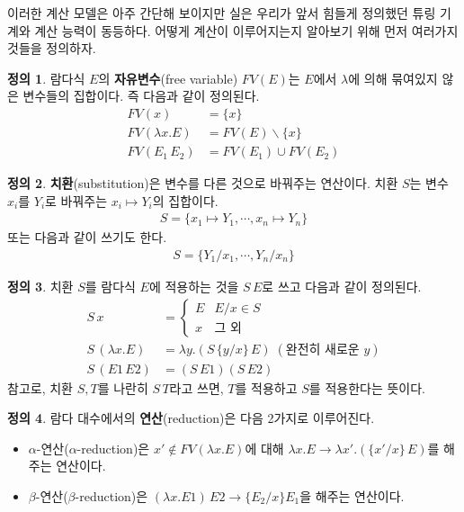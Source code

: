 \documentclass[b5paper]{book}
\theoremstyle{definition}
\newtheorem{defn}{정의}[chapter]
\begin{document}
이러한 계산 모델은 아주 간단해 보이지만 실은 우리가 앞서 힘들게 정의했던 튜링 기계와 계산 능력이
동등하다. 어떻게 계산이 이루어지는지 알아보기 위해 먼저 여러가지 것들을 정의하자.
\begin{defn}
    람다식 $E$의 \textbf{자유변수}(free variable) $FV(E)$는 $E$에서 $\lambda$에 의해 묶여있지 않은
    변수들의 집합이다. 즉 다음과 같이 정의된다.
    \begin{align*}
        FV(x) &= \{ x \} \\ 
        FV(\lambda x. E) &= FV(E) \backslash \{x\} \\ 
        FV(E_1 \, E_2) &= FV(E_1) \cup FV(E_2) 
    \end{align*}
\end{defn}
\begin{defn}
    \textbf{치환}(substitution)은 변수를 다른 것으로 바꿔주는 연산이다. 치환 $S$는 변수 $x_i$를
    $Y_i$로 바꿔주는 $x_i \mapsto Y_i$의 집합이다.
    \begin{align*}
        S = \{ x_1 \mapsto Y_1, \cdots, x_n \mapsto Y_n\}
    \end{align*}
    또는 다음과 같이 쓰기도 한다.
    \begin{align*}
        S = \{ Y_1 / x_1, \cdots, Y_n / x_n \}
    \end{align*}
\end{defn}
\begin{defn}
    치환 $S$를 람다식 $E$에 적용하는 것을 $S \, E$로 쓰고 다음과 같이 정의된다.
    \begin{align*}
        S \, x &= 
            \begin{cases}
                E & E/x \in S \\
                x & \text{그 외} 
            \end{cases}  \\ 
        S \, (\lambda x. E) &= 
        \lambda y. (S \, \{ y/x\} \, E) \; (\text{완전히 새로운 } y) \\ 
        S \, (E1 \, E2) &= (S \, E1) (S \, E2) 
    \end{align*} 
    참고로, 치환 $S, T$를 나란히 $S \, T$라고 쓰면, $T$를 적용하고 $S$를 적용한다는 뜻이다.
\end{defn}
\begin{defn}
    람다 대수에서의 \textbf{연산}(reduction)은 다음 2가지로 이루어진다.
    \begin{itemize}
        \item $\alpha$-연산($\alpha$-reduction)은 
        $x' \notin FV(\lambda x. E)$에 대해 
        $\lambda x. E \rightarrow \lambda x'. (\{x'/x\} \, E)$를 해주는 연산이다.
        \item $\beta$-연산($\beta$-reduction)은
        $(\lambda x. E1) \, E2 \rightarrow \{ E_2 / x\}E_1$을 해주는 연산이다.
    \end{itemize}
\end{defn}
\end{document}
